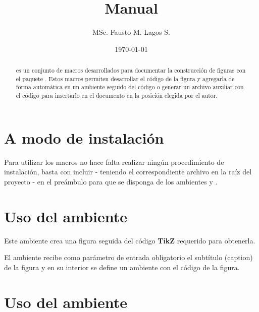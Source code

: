 \documentclass{article}
\title{Manual \bftt{TikZ2Code.tex}}
\author{MSc. Fausto M. Lagos S.}
\date{\today}
\begin{document}
\maketitle

\begin{abstract}
	 es un conjunto de macros desarrollados para documentar la construcción de figuras con el paquete . Estos macros permiten desarrollar el código de la figura  y agregarla de forma automática en un ambiente  seguido del código o generar un archivo auxiliar con el código para insertarlo en el documento en la posición elegida por el autor.
\end{abstract}

\section{A modo de instalación}

Para utilizar los macros  no hace falta realizar ningún procedimiento de instalación, basta con incluir \texttt{} - teniendo el correspondiente archivo en la raíz del proyecto - en el preámbulo para que se disponga de los ambientes  y .

\section{Uso del ambiente }

Este ambiente crea una figura seguida del código \textbf{TikZ} requerido para obtenerla.

\begin{latexPlusCodeLeftnoFrame}
\begin{tikzPlusCode}
\end{tikzPlusCode}
\end{latexPlusCodeLeftnoFrame}

El ambiente  recibe como parámetro de entrada obligatorio el subtítulo (caption) de la figura y en su interior se define un ambiente  con el código de la figura.

\section{Uso del ambiente }
\end{document}
